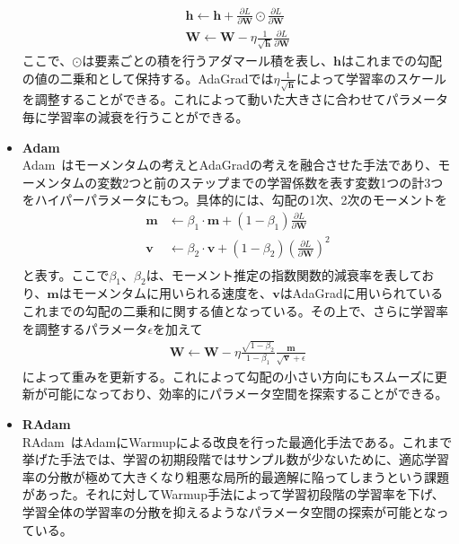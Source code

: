 \begin{itemize}
\begin{align}
\bm{h} \leftarrow \bm{h} + \frac{\partial L}{\partial \bm{W}} \odot \frac{\partial L}{\partial \bm{W}} \\
\bm{W} \leftarrow \bm{W} - \eta \frac{1}{\sqrt{\bm{h}}} \frac{\partial L}{\partial \bm{W}}
\end{align}
ここで、$\odot$は要素ごとの積を行うアダマール積を表し、$\bm{h}$はこれまでの勾配の値の二乗和として保持する。AdaGradでは$\eta \frac{1}{\sqrt{\bm{h}}}$によって学習率のスケールを調整することができる。これによって動いた大きさに合わせてパラメータ毎に学習率の減衰を行うことができる。
\item \textbf{Adam}\\
Adam~\cite{adam}はモーメンタムの考えとAdaGradの考えを融合させた手法であり、モーメンタムの変数2つと前のステップまでの学習係数を表す変数1つの計3つをハイパーパラメータにもつ。具体的には、勾配の1次、2次のモーメントを
\begin{align}
\bm{m} &\leftarrow \beta_1 \cdot \bm{m} +  (1 - \beta_1) \frac{\partial L}{\partial \bm{W}} \\
\bm{v} &\leftarrow \beta_2 \cdot \bm{v} +  (1 - \beta_2) {\left( \frac{\partial L}{\partial \bm{W}} \right) }^2 \\
\end{align}
と表す。ここで$\beta_1$、$\beta_2$は、モーメント推定の指数関数的減衰率を表しており、$\bm{m}$はモーメンタムに用いられる速度を、$\bm{v}$はAdaGradに用いられているこれまでの勾配の二乗和に関する値となっている。その上で、さらに学習率を調整するパラメータ$\epsilon$を加えて
\begin{align}
\bm{W} \leftarrow \bm{W} - \eta \frac{\sqrt{1-\beta_2}}{1-\beta_1} \frac{\bm{m}}{\sqrt{\bm{v}} + \epsilon}
\end{align}
によって重みを更新する。これによって勾配の小さい方向にもスムーズに更新が可能になっており、効率的にパラメータ空間を探索することができる。
\item \textbf{RAdam}\\
RAdam~\cite{radam}はAdamにWarmupによる改良を行った最適化手法である。これまで挙げた手法では、学習の初期段階ではサンプル数が少ないために、適応学習率の分散が極めて大きくなり粗悪な局所的最適解に陥ってしまうという課題があった。それに対してWarmup手法によって学習初段階の学習率を下げ、学習全体の学習率の分散を抑えるようなパラメータ空間の探索が可能となっている。
\end{itemize}

